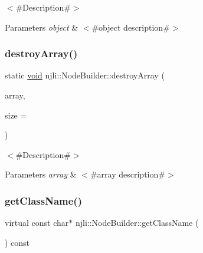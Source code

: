 $<$\#\+Description\#$>$


\begin{DoxyParams}{Parameters}
{\em object} & $<$\#object description\#$>$ \\
\hline
\end{DoxyParams}
\mbox{\label{classnjli_1_1_node_builder_a1e3ef77bb9b523dc0fdba32be7cdfd5c}} 
\subsubsection{\texorpdfstring{destroy\+Array()}{destroyArray()}}
{\footnotesize\ttfamily static \mbox{\hyperlink{_thread_8h_af1e856da2e658414cb2456cb6f7ebc66}{void}} njli\+::\+Node\+Builder\+::destroy\+Array (\begin{DoxyParamCaption}\item[{\mbox{\hyperlink{classnjli_1_1_node_builder}{Node\+Builder}} $\ast$$\ast$}]{array,  }\item[{const \mbox{\hyperlink{_util_8h_a10e94b422ef0c20dcdec20d31a1f5049}{u32}}}]{size = {} }\end{DoxyParamCaption})\hspace{0.3cm}{\ttfamily [static]}}

$<$\#\+Description\#$>$


\begin{DoxyParams}{Parameters}
{\em array} & $<$\#array description\#$>$ \\
\hline
\end{DoxyParams}
\mbox{\label{classnjli_1_1_node_builder_ae22fb55f9cb25b7cd94fce32d5dc6004}} 
\subsubsection{\texorpdfstring{get\+Class\+Name()}{getClassName()}}
{\footnotesize\ttfamily virtual const char$\ast$ njli\+::\+Node\+Builder\+::get\+Class\+Name (\begin{DoxyParamCaption}{ }\end{DoxyParamCaption}) const\hspace{0.3cm}{\ttfamily [virtual]}}


